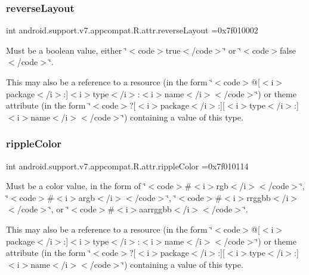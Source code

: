 \subsubsection{\texorpdfstring{reverse\+Layout}{reverseLayout}}
{\footnotesize\ttfamily int android.\+support.\+v7.\+appcompat.\+R.\+attr.\+reverse\+Layout =0x7f010002\hspace{0.3cm}{\ttfamily [static]}}

Must be a boolean value, either \char`\"{}$<$code$>$true$<$/code$>$\char`\"{} or \char`\"{}$<$code$>$false$<$/code$>$\char`\"{}. 

This may also be a reference to a resource (in the form \char`\"{}$<$code$>$@\mbox{[}$<$i$>$package$<$/i$>$\+:\mbox{]}$<$i$>$type$<$/i$>$\+:$<$i$>$name$<$/i$>$$<$/code$>$\char`\"{}) or theme attribute (in the form \char`\"{}$<$code$>$?\mbox{[}$<$i$>$package$<$/i$>$\+:\mbox{]}\mbox{[}$<$i$>$type$<$/i$>$\+:\mbox{]}$<$i$>$name$<$/i$>$$<$/code$>$\char`\"{}) containing a value of this type. \mbox{\label{classandroid_1_1support_1_1v7_1_1appcompat_1_1R_1_1attr_a48d6a24411e563366d3c82b2505a0e8c}} 
\subsubsection{\texorpdfstring{ripple\+Color}{rippleColor}}
{\footnotesize\ttfamily int android.\+support.\+v7.\+appcompat.\+R.\+attr.\+ripple\+Color =0x7f010114\hspace{0.3cm}{\ttfamily [static]}}

Must be a color value, in the form of \char`\"{}$<$code$>$\#$<$i$>$rgb$<$/i$>$$<$/code$>$\char`\"{}, \char`\"{}$<$code$>$\#$<$i$>$argb$<$/i$>$$<$/code$>$\char`\"{}, \char`\"{}$<$code$>$\#$<$i$>$rrggbb$<$/i$>$$<$/code$>$\char`\"{}, or \char`\"{}$<$code$>$\#$<$i$>$aarrggbb$<$/i$>$$<$/code$>$\char`\"{}. 

This may also be a reference to a resource (in the form \char`\"{}$<$code$>$@\mbox{[}$<$i$>$package$<$/i$>$\+:\mbox{]}$<$i$>$type$<$/i$>$\+:$<$i$>$name$<$/i$>$$<$/code$>$\char`\"{}) or theme attribute (in the form \char`\"{}$<$code$>$?\mbox{[}$<$i$>$package$<$/i$>$\+:\mbox{]}\mbox{[}$<$i$>$type$<$/i$>$\+:\mbox{]}$<$i$>$name$<$/i$>$$<$/code$>$\char`\"{}) containing a value of this type. \mbox{\label{classandroid_1_1support_1_1v7_1_1appcompat_1_1R_1_1attr_a408b8a2fc893dd24796a5646f93c512e}} 
